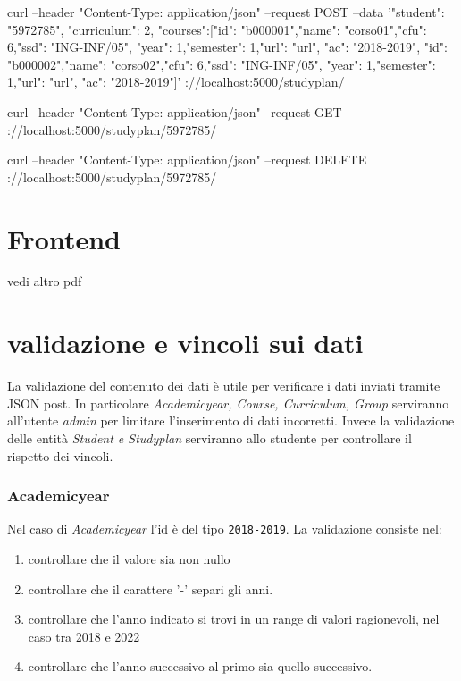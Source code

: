 \documentclass{article}
\begin{document}
\begin{shell}[caption=CRUD Studyplan]
curl --header "Content-Type: application/json"  --request POST --data '{"student": "5972785", "curriculum":  2, "courses":[{"id": "b000001","name": "corso01","cfu": 6,"ssd": "ING-INF/05", "year": 1,"semester": 1,"url": "url", "ac": "2018-2019"}, {"id": "b000002","name": "corso02","cfu": 6,"ssd": "ING-INF/05", "year": 1,"semester": 1,"url": "url", "ac": "2018-2019"}]}' \http://localhost:5000/studyplan/

curl --header "Content-Type: application/json" --request GET \http://localhost:5000/studyplan/5972785/

curl --header "Content-Type: application/json" --request DELETE \http://localhost:5000/studyplan/5972785/
\end{shell}

\section{Frontend}

vedi altro pdf

\section{validazione e vincoli sui dati}
La validazione del contenuto dei dati è utile per verificare i dati inviati tramite JSON post. In particolare \emph{ Academicyear, Course, Curriculum, Group} serviranno all'utente \textit{admin} per limitare l'inserimento di dati incorretti. Invece la validazione delle entità \emph{Student e  Studyplan} serviranno allo studente per controllare il rispetto dei vincoli.
\subsubsection{Academicyear}
Nel caso di \emph{ Academicyear} l'id è del tipo \texttt{2018-2019}.  La validazione consiste nel:
\begin{enumerate}
\item controllare che il valore sia non nullo
\item controllare che  il carattere '-' separi gli anni.
\item controllare che l'anno indicato si trovi in un range di valori ragionevoli, nel caso tra  2018 e 2022
\item controllare che l'anno successivo al primo sia quello successivo.
\end{enumerate}
\end{document}

